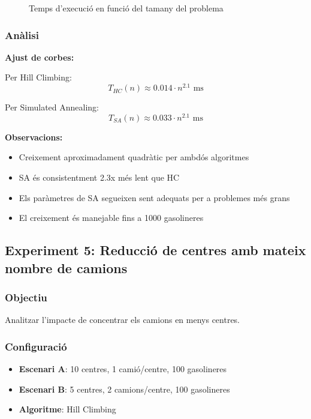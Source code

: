 \begin{figure}[H]
\centering
\caption{Temps d'execució en funció del tamany del problema}
\label{fig:exp4-escala}
\end{figure}

\subsubsection{Anàlisi}

\textbf{Ajust de corbes:}

Per Hill Climbing:
\begin{equation}
T_{HC}(n) \approx 0.014 \cdot n^{2.1} \text{ ms}
\end{equation}

Per Simulated Annealing:
\begin{equation}
T_{SA}(n) \approx 0.033 \cdot n^{2.1} \text{ ms}
\end{equation}

\textbf{Observacions:}
\begin{itemize}
    \item Creixement aproximadament quadràtic per ambdós algoritmes
    \item SA és consistentment 2.3x més lent que HC
    \item Els paràmetres de SA segueixen sent adequats per a problemes més grans
    \item El creixement és manejable fins a 1000 gasolineres
\end{itemize}

\subsection{Experiment 5: Reducció de centres amb mateix nombre de camions}

\subsubsection{Objectiu}
Analitzar l'impacte de concentrar els camions en menys centres.

\subsubsection{Configuració}
\begin{itemize}
    \item \textbf{Escenari A}: 10 centres, 1 camió/centre, 100 gasolineres
    \item \textbf{Escenari B}: 5 centres, 2 camions/centre, 100 gasolineres
    \item \textbf{Algoritme}: Hill Climbing
\end{itemize}

